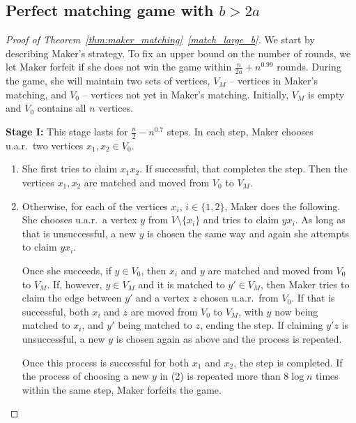 \documentclass[11pt, a4paper]{article}
\numberwithin{equation}{section}
\numberwithin{figure}{section}
\begin{document}
\bigskip



\subsection{Perfect matching game with $b> 2a$}

\begin{proof}[Proof of Theorem~\ref{thm:maker_matching}~\ref{match_large_b}]
We start by describing Maker's strategy. 
To fix an upper bound on the number of rounds, we let Maker forfeit
if she does not win the game within $\frac{n}{2a}+n^{0.99}$ rounds.
During the game, she will maintain two sets of vertices, $V_M$ -- vertices in Maker's matching, and $V_0$ -- vertices not yet in Maker's matching. Initially, $V_M$ is empty and $V_0$ contains all $n$ vertices.


\medskip

\textbf{Stage I:} This stage lasts for $\frac{n}{2} - n^{0.7}$ steps. In each step, Maker chooses u.a.r.~two vertices $x_1, x_2\in V_0$. 

\begin{enumerate}
\item[(1)] She first tries to claim $x_1x_2$. If successful, that completes the step. Then the vertices $x_1, x_2$ are matched and moved from $V_0$ to $V_M$.

\item[(2)] Otherwise, for each of the vertices $x_i$, $i\in \{1,2\}$, Maker does the following. She chooses u.a.r.~a vertex $y$ from $V\setminus \{x_i\}$ and tries to claim $y x_i$. As long as that is unsuccessful, a new $y$ is chosen the same way and again she attempts to claim $y x_i$.

Once she succeeds, if $y\in V_0$, then $x_i$ and $y$ are matched and moved from $V_0$ to $V_M$. If, however, $y\in V_M$ and it is matched to $y'\in  V_M$, then Maker tries to claim the edge between $y'$ and a vertex $z$ chosen u.a.r.~from $V_0$. If that is successful, both $x_i$ and $z$ are moved from $V_0$ to $V_M$, with $y$ now being matched to $x_i$, and $y'$ being matched to $z$, ending the step. If claiming $y'z$ is unsuccessful, a new $y$ is chosen again as above and the process is repeated.

Once this process is successful for both $x_1$ and $x_2$, the step is completed. If the process of choosing a new $y$ in (2) is repeated more than $8 \log n$ times within the same step, Maker forfeits the game.


\end{enumerate}
\end{proof}
\end{document}
